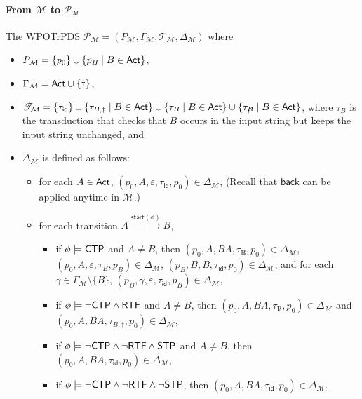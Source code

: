 \documentclass[preprint,12pt]{elsarticle}
\newcommand\Mm{{\mathcal{M} }}
\newcommand\Pp{{\mathcal{P} }}
\newcommand\act{{\sf Act}}
\newcommand\ctpflag{{\sf CTP}}
\newcommand\stpflag{{\sf STP}}
\newcommand\rtfflag{{\sf RTF}}
\newcommand\back{{\mathsf{back} }}
\newcommand\startactivity{{\mathsf{start} }}
\newcommand{\CTK}{\mathsf{CTK}}
\newcommand{\id}{\mathsf{id}}
\newcommand\TranSet{{\mathscr{T} }}
\newcommand{\WOTrPDS}{\textsf{WPOTrPDS}}
\begin{document}
\paragraph*{From $\Mm$ to $\Pp_\Mm$} 
The {\WOTrPDS} $\Pp_\Mm = (P_\Mm, \Gamma_\Mm, \TranSet_\Mm, \Delta_\Mm)$ where 
\begin{itemize}
\item $P_{\Mm} = \{p_0\}\cup\{ p_{B}\mid B\in\act\}$,
\item $\Gamma_{\Mm} = \act \cup \{\dag\}$, 
\item $\TranSet_\Mm = \{\tau_{\id} \}\cup \{\tau_{B, \dag} \mid B \in \act\} \cup \{\tau_{B} \mid B \in \act\}  \cup \{\tau_{\not B} \mid B \in \act\}$, where $\tau_B$ is the transduction that checks that $B$ occurs in the input string but keeps the input string unchanged, and 
\item $\Delta_{\Mm}$ is defined as follows:
        \begin{itemize}
            \item for each $A \in \act$, $(p_0, A, \varepsilon, \tau_{\id}, p_0) \in \Delta_{\Mm}$, (Recall that $\back$ can be applied anytime in $\Mm$.)
			\item for each transition $A \xrightarrow{\startactivity(\phi)} B$, 
			\begin{itemize}
				\item if $\phi \models \ctpflag$ and $A \neq B$, then $(p_0, A, BA, \tau_{\not B}, p_0) \in \Delta_{\Mm}$, $(p_0, A, \varepsilon, \tau_{B}, p_B) \in \Delta_{\Mm}$, $(p_B, B, B, \tau_{\id}, p_0)  \in \Delta_{\Mm}$, and for each $\gamma \in \Gamma_\Mm \setminus \{B\}$, $(p_B, \gamma, \varepsilon, \tau_{\id}, p_B) \in \Delta_{\Mm}$, 
%
				\item if $\phi\models \neg\ctpflag \wedge \rtfflag$ and $A \neq B$, then $(p_0, A, BA, \tau_{\not B}, p_0) \in \Delta_{\Mm}$ 
                and $(p_0, A, BA, \tau_{B, \dag}, p_0) \in \Delta_{\Mm}$,
				\item if $\phi \models \neg\ctpflag \wedge \neg \rtfflag \wedge \stpflag$ and $A \neq B$, then $(p_0, A, BA, \tau_{\id}, p_0) \in \Delta_{\Mm}$,
%
				\item if $\phi \models \neg\ctpflag \wedge \neg \rtfflag \wedge \neg \stpflag$, then $(p_0, A, BA, \tau_{\id}, p_0) \in \Delta_{\Mm}$.
			\end{itemize}
        \end{itemize}
\end{itemize}
\end{document}
